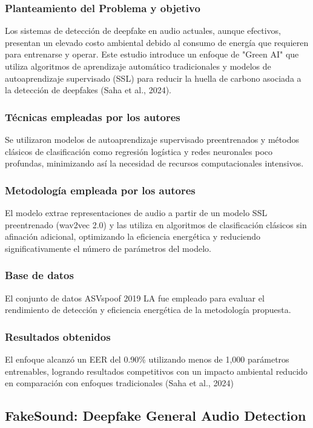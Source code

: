 \subsubsection{Planteamiento del Problema y objetivo }
Los sistemas de detección de deepfake en audio actuales, aunque efectivos, presentan un elevado costo ambiental debido al consumo de energía que requieren para entrenarse y operar. Este estudio introduce un enfoque de "Green AI" que utiliza algoritmos de aprendizaje automático tradicionales y modelos de autoaprendizaje supervisado (SSL) para reducir la huella de carbono asociada a la detección de deepfakes (Saha et al., 2024).

\subsubsection{Técnicas empleadas por los autores}
Se utilizaron modelos de autoaprendizaje supervisado preentrenados y métodos clásicos de clasificación como regresión logística y redes neuronales poco profundas, minimizando así la necesidad de recursos computacionales intensivos.

\subsubsection{Metodología empleada por los autores}
El modelo extrae representaciones de audio a partir de un modelo SSL preentrenado (wav2vec 2.0) y las utiliza en algoritmos de clasificación clásicos sin afinación adicional, optimizando la eficiencia energética y reduciendo significativamente el número de parámetros del modelo.

\subsubsection{Base de datos}
El conjunto de datos ASVspoof 2019 LA fue empleado para evaluar el rendimiento de detección y eficiencia energética de la metodología propuesta.

\subsubsection{Resultados obtenidos}
El enfoque alcanzó un EER del 0.90\% utilizando menos de 1,000 parámetros entrenables, logrando resultados competitivos con un impacto ambiental reducido en comparación con enfoques tradicionales (Saha et al., 2024)

\subsection{FakeSound: Deepfake General Audio Detection \citep*{xie2024fakesound}}

